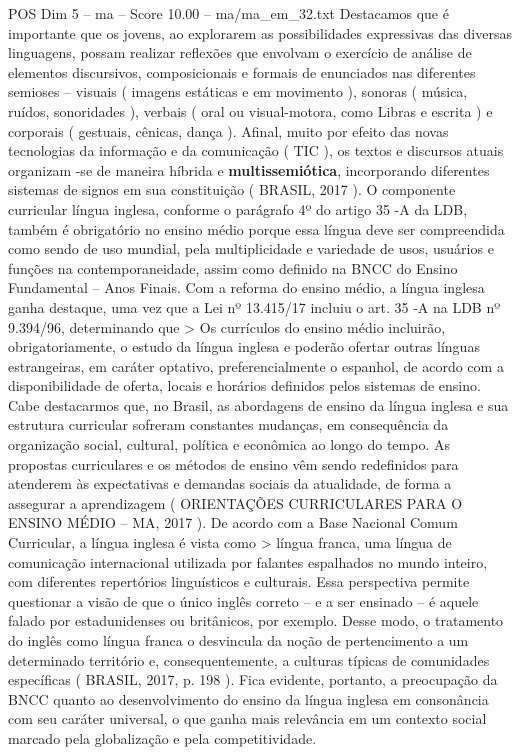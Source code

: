 \begin{textsample}{POS Dim 5 – ma – Score 10.00 – ma/ma\_em\_32.txt}
Destacamos que é importante que os jovens, ao explorarem as possibilidades expressivas das diversas linguagens, possam realizar reflexões que envolvam o exercício de análise de elementos discursivos, composicionais e formais de enunciados nas diferentes semioses – visuais ( imagens estáticas e em movimento ), sonoras ( música, ruídos, sonoridades ), verbais ( oral ou visual-motora, como Libras e escrita ) e corporais ( gestuais, cênicas, dança ).
Afinal, muito por efeito das novas tecnologias da informação e da comunicação ( TIC ), os textos e discursos atuais organizam -se de maneira híbrida e \textbf{multissemiótica}, incorporando diferentes sistemas de signos em sua constituição ( BRASIL, 2017 ).
O componente curricular língua inglesa, conforme o parágrafo 4º do artigo 35 -A da LDB, também é obrigatório no ensino médio porque essa língua deve ser compreendida como sendo de uso mundial, pela multiplicidade e variedade de usos, usuários e funções na contemporaneidade, assim como definido na BNCC do Ensino Fundamental – Anos Finais.
Com a reforma do ensino médio, a língua inglesa ganha destaque, uma vez que a Lei nº 13.415/17 incluiu o art. 35 -A na LDB nº 9.394/96, determinando que > Os currículos do ensino médio incluirão, obrigatoriamente, o estudo da língua inglesa e poderão ofertar outras línguas estrangeiras, em caráter optativo, preferencialmente o espanhol, de acordo com a disponibilidade de oferta, locais e horários definidos pelos sistemas de ensino.
Cabe destacarmos que, no Brasil, as abordagens de ensino da língua inglesa e sua estrutura curricular sofreram constantes mudanças, em consequência da organização social, cultural, política e econômica ao longo do tempo.
As propostas curriculares e os métodos de ensino vêm sendo redefinidos para atenderem às expectativas e demandas sociais da atualidade, de forma a assegurar a aprendizagem ( ORIENTAÇÕES CURRICULARES PARA O ENSINO MÉDIO – MA, 2017 ).
De acordo com a Base Nacional Comum Curricular, a língua inglesa é vista como > língua franca, uma língua de comunicação internacional utilizada por falantes espalhados no mundo inteiro, com diferentes repertórios linguísticos e culturais.
Essa perspectiva permite questionar a visão de que o único inglês correto – e a ser ensinado – é aquele falado por estadunidenses ou britânicos, por exemplo.
Desse modo, o tratamento do inglês como língua franca o desvincula da noção de pertencimento a um determinado território e, consequentemente, a culturas típicas de comunidades específicas ( BRASIL, 2017, p. 198 ).
Fica evidente, portanto, a preocupação da BNCC quanto ao desenvolvimento do ensino da língua inglesa em consonância com seu caráter universal, o que ganha mais relevância em um contexto social marcado pela globalização e pela competitividade.

\end{textsample}
